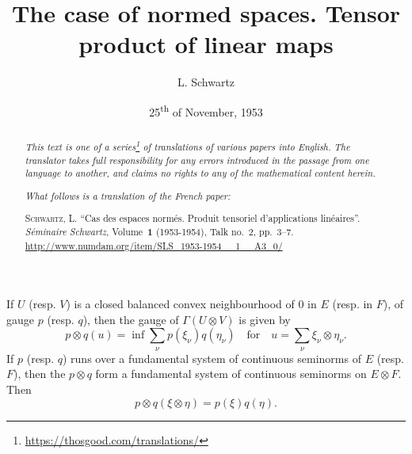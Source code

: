 \documentclass{article}
\title{The case of normed spaces. Tensor product of linear maps}
\author{L. Schwartz}
\date{25\textsuperscript{th} of November, 1953}
\theoremstyle{plain}
\newenvironment{proposition}[1]
    {\renewcommand\theinnercustomproposition{#1}\innercustomproposition}
    {\endinnercustomproposition}
\theoremstyle{definition}
\newcommand{\oldpage}[1]{\marginpar{\footnotesize$\Big\vert$ \textit{p.~#1}}}
\begin{document}
\maketitle
\thispagestyle{fancy}

\renewcommand{\abstractname}{Translator's note.}

\begin{abstract}
  \renewcommand*{\thefootnote}{\fnsymbol{footnote}}
  \emph{This text is one of a series\footnote{\url{https://thosgood.com/translations/}} of translations of various papers into English.}
  \emph{The translator takes full responsibility for any errors introduced in the passage from one language to another, and claims no rights to any of the mathematical content herein.}
  
  \emph{What follows is a translation of the French paper:}

  \medskip\noindent
  \textsc{Schwartz, L.}
  ``Cas des espaces norm\'{e}s. Produit tensoriel d'applications lin\'{e}aires''.
  \emph{S\'{e}minaire Schwartz}, Volume~\textbf{1} (1953-1954), Talk no.~2, pp.~3--7.
  {\footnotesize\url{http://www.numdam.org/item/SLS_1953-1954__1__A3_0/}}
\end{abstract}

\setcounter{footnote}{0}



\oldpage{3}
\begin{proposition}{1}
  If $U$ (resp. $V$) is a closed balanced convex neighbourhood of $0$ in $E$ (resp. in $F$), of gauge $p$ (resp. $q$), then the gauge of $\Gamma(U\otimes V)$ is given by
  \[
  \label{equation1}
    p\otimes q(u) = \inf\sum_\nu p(\xi_\nu)q(\eta_\nu)
    \quad\text{for}\quad
    u=\sum_\nu\xi_\nu\otimes\eta_\nu.
  \tag{1}
  \]
  If $p$ (resp. $q$) runs over a fundamental system of continuous seminorms of $E$ (resp. $F$), then the $p\otimes q$ form a fundamental system of continuous seminorms on $E\otimes F$.
  Then
  \[
  \label{equation2}
    p\otimes q(\xi\otimes\eta) = p(\xi)q(\eta).
  \tag{2}
  \]
\end{proposition}
\end{document}
